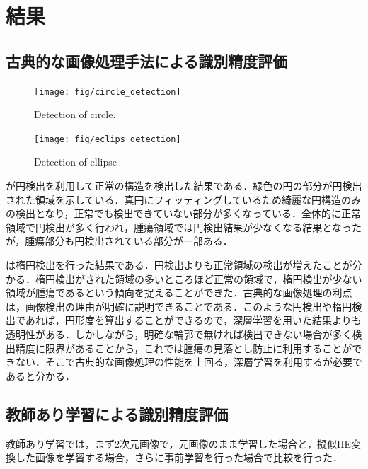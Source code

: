 
\chapter{結果}\label{chap_result}

\section{古典的な画像処理手法による識別精度評価}
\begin{figure}[H]
	\centering
	\texttt{[image: fig/circle\_detection]}
	\caption{Detection of circle.}
	\label{fig:circle_detection}
\end{figure}

\begin{figure}[H]
	\centering
	\texttt{[image: fig/eclips\_detection]}
	\caption{Detection of ellipse}
	\label{fig:ellipse_detection}
\end{figure}

が円検出を利用して正常の構造を検出した結果である．緑色の円の部分が円検出された領域を示している．真円にフィッティングしているため綺麗な円構造のみの検出となり，正常でも検出できていない部分が多くなっている．全体的に正常領域で円検出が多く行われ，腫瘍領域では円検出結果が少なくなる結果となったが，腫瘍部分も円検出されている部分が一部ある．

は楕円検出を行った結果である．円検出よりも正常領域の検出が増えたことが分かる．楕円検出がされた領域の多いところほど正常の領域で，楕円検出が少ない領域が腫瘍であるという傾向を捉えることができた．古典的な画像処理の利点は，画像検出の理由が明確に説明できることである．このような円検出や楕円検出であれば，円形度を算出することができるので，深層学習を用いた結果よりも透明性がある．しかしながら，明確な輪郭で無ければ検出できない場合が多く検出精度に限界があることから，これでは腫瘍の見落とし防止に利用することができない．そこで古典的な画像処理の性能を上回る，深層学習を利用するが必要であると分かる．


\section{教師あり学習による識別精度評価}
教師あり学習では，まず2次元画像で，元画像のまま学習した場合と，擬似HE変換した画像を学習する場合，さらに事前学習を行った場合で比較を行った．

